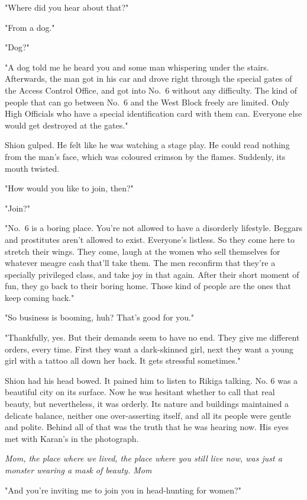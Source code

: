 "\el Where did you hear about that?"

"From a dog."

"Dog?"

"A dog told me he heard you and some man whispering under the stairs.
Afterwards, the man got in his car and drove right through the special
gates of the Access Control Office, and got into No.~6 without any
difficulty. The kind of people that can go between No.~6 and the West
Block freely are limited. Only High Officials who have a special
identification card with them can. Everyone else would get destroyed at
the gates."

Shion gulped. He felt like he was watching a stage play. He could read
nothing from the man's face, which was coloured crimson by the flames.
Suddenly, its mouth twisted.

"How would you like to join, then?"

"Join?"

"No.~6 is a boring place. You're not allowed to have a disorderly
lifestyle. Beggars and prostitutes aren't allowed to exist. Everyone's
listless. So they come here to stretch their wings. They come, laugh at
the women who sell themselves for whatever meagre cash that'll take
them. The men reconfirm that they're a specially privileged class, and
take joy in that again. After their short moment of fun, they go back to
their boring home. Those kind of people are the ones that keep coming
back."

"So business is booming, huh? That's good for you."

"Thankfully, yes. But their demands seem to have no end. They give me
different orders, every time. First they want a dark-skinned girl, next
they want a young girl with a tattoo all down her back. It gets
stressful sometimes."

Shion had his head bowed. It pained him to listen to Rikiga talking. No.
6 was a beautiful city on its surface. Now he was hesitant whether to
call that real beauty, but nevertheless, it was orderly. Its nature and
buildings maintained a delicate balance, neither one over-asserting
itself, and all its people were gentle and polite. Behind all of that
was the truth that he was hearing now. His eyes met with Karan's in the
photograph.

\emph{Mom, the place where we lived, the place where you still live now, was
just a monster wearing a mask of beauty. Mom\el }

"And you're inviting me to join you in head-hunting for women?"

